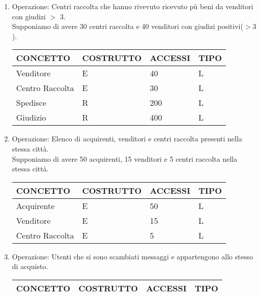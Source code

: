 \documentclass[a4paper, 10pt]{report}
\begin{document}
\begin{enumerate}
\item Operazione: Centri raccolta che hanno rivevuto ricevuto p\`u beni da venditori
      con giudizi $>$ 3.\\
      Supponiamo di avere 30 centri raccolta e 40 venditori con giudizi positivi($>3$).
\begin{table}[h!]
\centering
\begin{tabular}{|l|l|l|l|}
\hline
\textbf{CONCETTO}&\textbf{COSTRUTTO}&\textbf{ACCESSI}&\textbf{TIPO}\\
\hline
Venditore & E & 40 & L\\
\hline
Centro Raccolta & E & 30 & L\\
\hline 
Spedisce & R & 200 & L\\
\hline
Giudizio & R & 400 & L\\
\hline
\end{tabular}
\end{table}

\item Operazione: Elenco di acquirenti, venditori e centri raccolta
      presenti nella stessa citt\`a.\\
      Supponiamo di avere 50 acquirenti, 15 venditori e 5 centri raccolta
      nella stessa citt\`a.
\begin{table}[h!]
\centering
\begin{tabular}{|l|l|l|l|}
\hline
\textbf{CONCETTO}&\textbf{COSTRUTTO}&\textbf{ACCESSI}&\textbf{TIPO}\\
\hline
Acquirente & E & 50 & L\\
\hline
Venditore & E & 15 & L\\
\hline
Centro Raccolta & E & 5 & L\\
\hline
\end{tabular}
\end{table}

\item Operazione: Utenti che si sono scambiati messaggi e appartengono
      allo stesso di acquisto.
\begin{table}[h!]
\centering
\begin{tabular}{|l|l|l|l|}
\hline
\textbf{CONCETTO}&\textbf{COSTRUTTO}&\textbf{ACCESSI}&\textbf{TIPO}\\
\hline

\hline
\end{tabular}
\end{table}
\end{enumerate}
\end{document}
